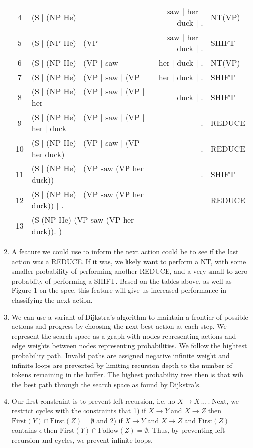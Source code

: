 \begin{enumerate}[label={\arabic*.}]
\begin{center}
\begin{tabular}{ c|l|r|l }
		4 & (S $|$ (NP He) & saw $|$ her $|$ duck $|$ . & NT(VP) \\
		5 & (S $|$ (NP He) $|$ (VP & saw $|$ her $|$ duck $|$ . & SHIFT \\
		6 & (S $|$ (NP He) $|$ (VP $|$ saw & her $|$ duck $|$ . & NT(VP) \\
		7 & (S $|$ (NP He) $|$ (VP $|$ saw $|$ (VP & her $|$ duck $|$ . & SHIFT \\
		8 & (S $|$ (NP He) $|$ (VP $|$ saw $|$ (VP $|$ her & duck $|$ . & SHIFT \\
		9 & (S $|$ (NP He) $|$ (VP $|$ saw $|$ (VP $|$ her $|$ duck & . & REDUCE \\
		10 & (S $|$ (NP He) $|$ (VP $|$ saw $|$ (VP her duck) & . & REDUCE \\
		11 & (S $|$ (NP He) $|$ (VP saw (VP her duck)) & . & SHIFT \\
		12 & (S $|$ (NP He) $|$ (VP saw (VP her duck)) $|$ . & & REDUCE \\
		13 & (S (NP He) (VP saw (VP her duck)). ) & & \\
		\hline
	    \end{tabular}
	\end{center}
    \item A feature we could use to inform the next action could be to see if the last action was a REDUCE. If it was, we likely want to perform a NT, with some smaller probability of performing another REDUCE, and a very small to zero probablity of performing a SHIFT. Based on the tables above, as well as Figure 1 on the spec, this feature will give us increased performance in classifying the next action.
    \item We can use a variant of Dijkstra's algorithm to maintain a frontier of possible actions and progress by choosing the next best action at each step. We represent the search space as a graph with nodes representing actions and edge weights between nodes representing probabilities. We follow the hightest probability path. Invalid paths are assigned negative infinite weight and infinite loops are prevented by limiting recursion depth to the number of tokens remaining in the buffer. The highest probability tree then is that wih the best path through the search space as found by Dijkstra's. 
    \item Our first constraint is to prevent left recursion, i.e. no $X \rightarrow X \, ...\, $. Next, we restrict cycles with the constraints that 1) if $X \rightarrow Y$ and $X \rightarrow Z$ then $\textrm{First}(Y) \cap \textrm{First}(Z) = \emptyset$ and 2) if $X \rightarrow Y$ and $X \rightarrow Z$ and $\textrm{First}(Z)$ contains $\epsilon$ then $\textrm{First}(Y) \cap \textrm{Follow}(Z) = \emptyset$. Thus, by preventing left recursion and cycles, we prevent infinite loops.
\end{enumerate}
